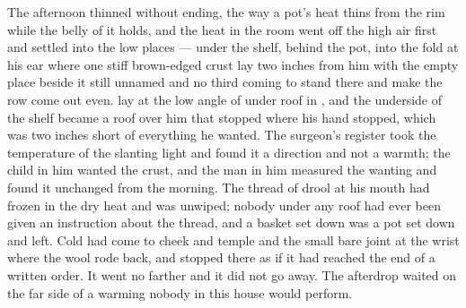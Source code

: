 The afternoon thinned without ending, the way a pot's heat thins from the rim while the belly of it holds, and the heat in the room went off the high air first and settled into the low places --- under the shelf, behind the pot, into the fold at his ear where one stiff brown-edged crust lay two inches from him with the empty place beside it still unnamed and no third coming to stand there and make the row come out even.  lay at the low angle of  under  roof in , and the underside of the shelf became a roof over him that stopped where his hand stopped, which was two inches short of everything he wanted. The surgeon's register took the temperature of the slanting light and found it a direction and not a warmth; the child in him wanted the crust, and the man in him measured the wanting and found it unchanged from the morning. The thread of drool at his mouth had frozen in the dry heat and was unwiped; nobody under any roof had ever been given an instruction about the thread, and a basket set down was a pot set down and left. Cold had come to cheek and temple and the small bare joint at the wrist where the wool rode back, and stopped there as if it had reached the end of a written order. It went no farther and it did not go away. The afterdrop waited on the far side of a warming nobody in this house would perform.


